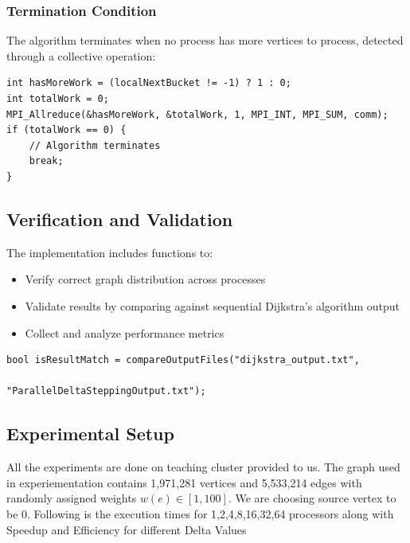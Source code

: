 \documentclass{article}
\begin{document}
\subsubsection*{Termination Condition}
The algorithm terminates when no process has more vertices to process, detected through a collective operation:
\begin{verbatim}
int hasMoreWork = (localNextBucket != -1) ? 1 : 0;
int totalWork = 0;
MPI_Allreduce(&hasMoreWork, &totalWork, 1, MPI_INT, MPI_SUM, comm);
if (totalWork == 0) {
    // Algorithm terminates
    break;
}
\end{verbatim}

\subsection*{Verification and Validation}
The implementation includes functions to:
\begin{itemize}
    \item Verify correct graph distribution across processes
    \item Validate results by comparing against sequential Dijkstra's algorithm output
    \item Collect and analyze performance metrics
\end{itemize}

\begin{verbatim}
bool isResultMatch = compareOutputFiles("dijkstra_output.txt", 
                                       "ParallelDeltaSteppingOutput.txt");
\end{verbatim}

\subsection*{Experimental Setup}
All the experiments are done on teaching cluster provided to us. The graph used in experiementation contains 1,971,281 vertices and 5,533,214 edges with randomly assigned weights $w(e) \in [1, 100]$. We are choosing source vertex to be 0. Following is the execution times for 1,2,4,8,16,32,64 processors along with Speedup and Efficiency for different Delta Values
\end{document}
